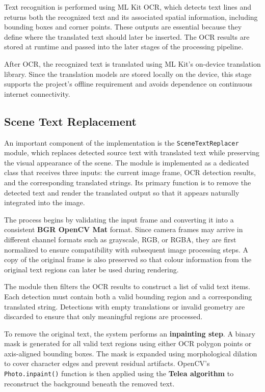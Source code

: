 Text recognition is performed using ML Kit OCR, which detects text lines and returns both the recognized text and its associated spatial information, including bounding boxes and corner points. These outputs are essential because they define where the translated text should later be inserted. The OCR results are stored at runtime and passed into the later stages of the processing pipeline.

After OCR, the recognized text is translated using ML Kit's on-device translation library. Since the translation models are stored locally on the device, this stage supports the project's offline requirement and avoids dependence on continuous internet connectivity.

\subsection{Scene Text Replacement}

An important component of the implementation is the \texttt{SceneTextReplacer} module, which replaces detected source text with translated text while preserving the visual appearance of the scene. The module is implemented as a dedicated class that receives three inputs: the current image frame, OCR detection results, and the corresponding translated strings. Its primary function is to remove the detected text and render the translated output so that it appears naturally integrated into the image.

The process begins by validating the input frame and converting it into a consistent \textbf{BGR OpenCV Mat} format. Since camera frames may arrive in different channel formats such as grayscale, RGB, or RGBA, they are first normalized to ensure compatibility with subsequent image processing steps. A copy of the original frame is also preserved so that colour information from the original text regions can later be used during rendering.

The module then filters the OCR results to construct a list of valid text items. Each detection must contain both a valid bounding region and a corresponding translated string. Detections with empty translations or invalid geometry are discarded to ensure that only meaningful regions are processed.

To remove the original text, the system performs an \textbf{inpainting step}. A binary mask is generated for all valid text regions using either OCR polygon points or axis-aligned bounding boxes. The mask is expanded using morphological dilation to cover character edges and prevent residual artifacts. OpenCV’s \texttt{Photo.inpaint()} function is then applied using the \textbf{Telea algorithm} to reconstruct the background beneath the removed text.

